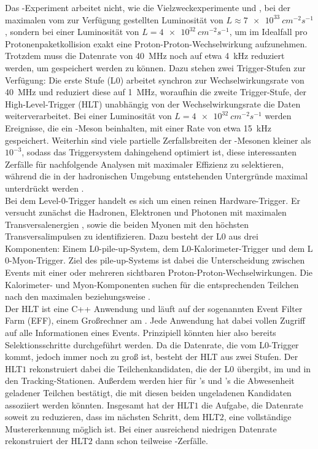 Das \lhcb-Experiment arbeitet nicht, wie die Vielzweckexperimente \atlas und \cms, bei der maximalen vom \lhc zur Verfügung gestellten Luminosität von $L\approx\SI[exponent-product = \cdot]{7e33}{cm^{-2}s^{-1}}$, sondern bei einer Luminosität von $L=\SI[exponent-product = \cdot]{4e32}{cm^{-2}s^{-1}}$, um im Idealfall pro Protonenpaketkollision exakt eine Proton-Proton-Wechselwirkung aufzunehmen. Trotzdem muss die Datenrate von \SI{40}{MHz} noch auf etwa \SI{4}{kHz} reduziert werden, um gespeichert werden zu können. Dazu stehen zwei Trigger-Stufen zur Verfügung: Die erste Stufe (L$0$) arbeitet synchron zur Wechselwirkungsrate von \SI{40}{MHz} und reduziert diese auf \SI{1}{MHz}, woraufhin die zweite Trigger-Stufe, der High-Level-Trigger (HLT) unabhängig von der Wechselwirkungsrate die Daten weiterverarbeitet. Bei einer Luminosität von $L=\SI[exponent-product = \cdot]{4e32}{cm^{-2}s^{-1}}$ werden Ereignisse, die ein \B-Meson beinhalten, mit einer Rate von etwa \SI{15}{kHz} gespeichert. Weiterhin sind viele partielle Zerfallsbreiten der \B-Mesonen kleiner als $10^{-3}$, sodass das  Triggersystem dahingehend optimiert ist, diese interessanten Zerfälle für nachfolgende Analysen mit maximaler Effizienz zu selektieren, während die in der hadronischen Umgebung entstehenden Untergründe maximal unterdrückt werden \cite{Alves:2008zz}.\\
Bei dem Level-0-Trigger handelt es sich um einen reinen Hardware-Trigger. Er versucht zunächst die Hadronen, Elektronen und Photonen mit maximalen Transversalenergien \et, sowie die beiden Myonen mit den höchsten Transversalimpulsen \pt zu identifizieren. Dazu besteht der L$0$ aus drei Komponenten: Einem L$0$-pile-up-System, dem L$0$-Kalorimeter-Trigger und dem L$0$-Myon-Trigger. Ziel des pile-up-Systems ist dabei die Unterscheidung zwischen Events mit einer oder mehreren sichtbaren Proton-Proton-Wechselwirkungen. Die Kalorimeter- und Myon-Komponenten suchen für die entsprechenden Teilchen nach den maximalen \et beziehungsweise \pt.\\
Der HLT ist eine C++ Anwendung und läuft auf der sogenannten Event Filter Farm (EFF), einem Großrechner am \cern. Jede Anwendung hat dabei vollen Zugriff auf alle Informationen eines Events. Prinzipiell könnten hier also bereits Selektionsschritte durchgeführt werden. Da die Datenrate, die vom L$0$-Trigger kommt, jedoch immer noch zu groß ist, besteht der HLT aus zwei Stufen. Der HLT$1$ rekonstruiert dabei die Teilchenkandidaten, die der L$0$ übergibt, im \velo und in den Tracking-Stationen. Außerdem werden hier für \g's und \piz's die Abwesenheit geladener Teilchen bestätigt, die mit diesen beiden ungeladenen Kandidaten assoziiert werden könnten. Insgesamt hat der HLT$1$ die Aufgabe, die Datenrate soweit zu reduzieren, dass im nächsten Schritt, dem HLT$2$, eine vollständige Mustererkennung möglich ist. Bei einer ausreichend niedrigen Datenrate rekonstruiert der HLT$2$ dann schon teilweise \B-Zerfälle.

